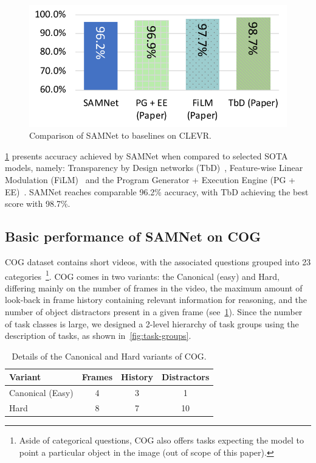 \begin{figure}[htbp]
	\centering
	\includegraphics[width=0.8\columnwidth]{../img/plots/clevr_baselines.pdf}
	\caption{Comparison of SAMNet to baselines on CLEVR.}
	\label{fig:clevr_baselines}
\end{figure}

\cref{fig:clevr_baselines} presents accuracy achieved by SAMNet when compared to selected SOTA models, namely: Transparency by Design networks (TbD)~\cite{mascharka2018transparency}, Feature-wise Linear Modulation (FiLM)~\cite{perez2018film} and the Program Generator + Execution Engine (PG + EE)~\cite{johnson2017inferring}.
SAMNet reaches comparable 96.2\% accuracy, with TbD achieving the best score with 98.7\%.


\subsection{Basic performance of SAMNet on COG}
\label{sec:cog-baseline-compare}

COG dataset contains short videos, with the associated questions grouped into 23 categories~\footnote{Aside of categorical questions, COG also offers tasks expecting the model to point a particular object in the image (out of scope of this paper).}.
COG comes in two variants: the Canonical (easy) and Hard, differing mainly on the number of frames in the video, the maximum amount of look-back in frame history containing relevant information for reasoning, and the number of object distractors present in a given frame (see~\cref{tab:cog_variants}).
Since the number of task classes is large, we designed a 2-level hierarchy of task groups using the
description of tasks, as shown in~\cref{fig:task-groups}.

\begin{table}[ht]
	\centering
	\begin{tabular}{lccc}
		\toprule
		Variant	& Frames & History	& Distractors \\
		\midrule
		Canonical (Easy) & 4 & 3 & 1\\
		Hard  & 8 & 7 & 10\\
		\bottomrule
	\end{tabular}
	\caption{Details of the Canonical and Hard variants of COG.}
	\label{tab:cog_variants}
\end{table}


